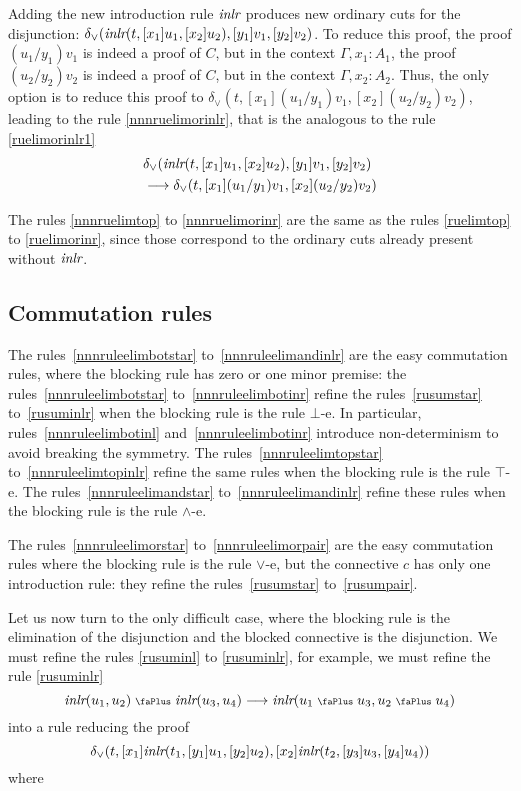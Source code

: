 \documentclass[screen, sigconf,authorversion,nonacm]{acmart}
\theoremstyle{acmdefinition}
\numberwithin{equation}{section}
\newcommand\abstr[1]{[#1]}
\newcommand\inlr{\mbox{\it inlr}}
\newcommand\elimor{\delta_{\vee}}
\newcommand\plus{\mathrel{\text{\normalfont\scalebox{0.7}{\faPlus}}}}
\newcommand\lra{\longrightarrow}
\begin{document}
Adding the new introduction rule $\inlr$ produces new ordinary cuts
for the disjunction: $\elimor(\inlr(t,\abstr{x_1} u_1,\abstr{x_2}
u_2), \abstr{y_1} v_1, \abstr{y_2} v_2)$.  To reduce this proof, the
proof $(u_1/y_1)v_1$ is indeed a proof of $C$, but in the context
$\Gamma, x_1:A_1$, the proof $(u_2/y_2)v_2$ is indeed a proof of $C$,
but in the context $\Gamma, x_2:A_2$. Thus, the only option is to
reduce this proof to $\elimor(t,\abstr{x_1} (u_1/y_1)v_1,
\abstr{x_2}(u_2/y_2)v_2)$, leading to the rule
\eqref{nnnruelimorinlr}, that is the analogous to the rule
\eqref{ruelimorinlr1}
\begin{align*}
&\elimor(\inlr(t,\abstr{x_1} u_1,\abstr{x_2} u_2),
\abstr{y_1} v_1, \abstr{y_2} v_2) 
\\
&\lra
\elimor(t,\abstr{x_1}(u_1/y_1)v_1,\abstr{x_2}(u_2/y_2)v_2)
\end{align*}

The rules \eqref{nnnruelimtop} to \eqref{nnnruelimorinr} are the same
as the rules \eqref{ruelimtop} to \eqref{ruelimorinr}, since those
correspond to the ordinary cuts already present without $\inlr$.

\subsection{Commutation rules}

The rules~\eqref{nnnruleelimbotstar} to~\eqref{nnnruleelimandinlr} are
the easy commutation rules, where the blocking rule has zero or one
minor premise: the rules~\eqref{nnnruleelimbotstar}
to~\eqref{nnnruleelimbotinr} refine the rules~\eqref{rusumstar}
to~\eqref{rusuminlr} when the blocking rule is the rule $\bot$-e.  In
particular, rules~\eqref{nnnruleelimbotinl}
and~\eqref{nnnruleelimbotinr} introduce non-determinism to avoid
breaking the symmetry.  The rules~\eqref{nnnruleelimtopstar}
to~\eqref{nnnruleelimtopinlr} refine the same rules when the blocking
rule is the rule $\top$-e.  The rules~\eqref{nnnruleelimandstar}
to~\eqref{nnnruleelimandinlr} refine these rules when the
blocking rule is the rule $\wedge$-e.

The rules~\eqref{nnnruleelimorstar} to~\eqref{nnnruleelimorpair} are
the easy commutation rules where the blocking rule is the rule
$\vee$-e, but the connective $c$ has only one introduction rule: they
refine the rules~\eqref{rusumstar} to~\eqref{rusumpair}.

Let us now turn to the only difficult case, where the blocking rule is
the elimination of the disjunction and the blocked connective is the
disjunction. We must refine the rules \eqref{rusuminl} to
\eqref{rusuminlr}, for example, we must refine the rule
\eqref{rusuminlr}
$$\inlr(u_1,u_2) \plus \inlr(u_3,u_4)
\longrightarrow \inlr(u_1 \plus u_3,u_2 \plus u_4)$$
into a rule reducing the proof
$$\elimor(t,\abstr{x_1} \inlr(t_1, \abstr{y_1}u_1,\abstr{y_2} u_2),
\abstr{x_2} \inlr(t_2, \abstr{y_3}u_3,\abstr{y_4} u_4))$$ 
where
\end{document}
